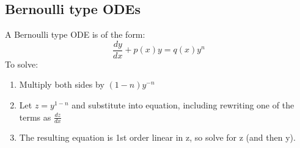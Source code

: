 \documentclass{scrartcl}
\begin{document}
\subsection{Bernoulli type ODEs}
A Bernoulli type ODE is of the form:
\begin{equation}
\frac{dy}{dx} + p(x)y = q(x)y^n
\end{equation}
To solve:
\begin{enumerate}
\item Multiply both sides by $ (1-n)y^{-n} $
\item Let $ z = y^{1-n} $ and substitute into equation, including rewriting one of the terms as $ \frac{dz}{dx} $
\item The resulting equation is 1st order linear in z, so solve for z (and then y).
\end{enumerate}
\end{document}

